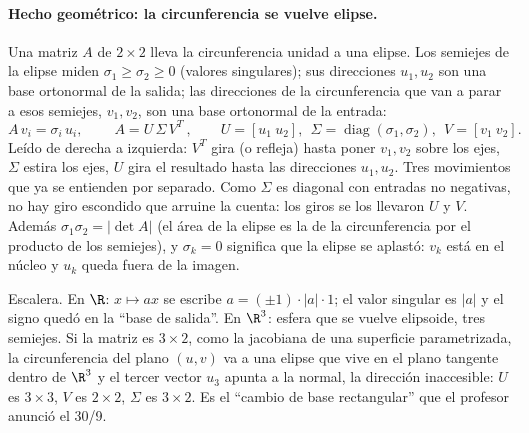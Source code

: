 \paragraph{Hecho geométrico: la circunferencia se vuelve elipse.} Una matriz \(A\) de
\(2\times2\) lleva la circunferencia unidad a una elipse. Los semiejes de la elipse miden
\(\sigma_1\ge\sigma_2\ge0\) (valores singulares); sus direcciones \(u_1,u_2\) son una base
ortonormal de la salida; las direcciones de la circunferencia que van a parar a esos
semiejes, \(v_1,v_2\), son una base ortonormal de la entrada:
\[
  A\,v_i=\sigma_i\,u_i,\qquad
  \boxed{\ A=U\,\Sigma\,V^T\ },\qquad
  U=[u_1\ u_2],\ \ \Sigma=\operatorname{diag}(\sigma_1,\sigma_2),\ \ V=[v_1\ v_2].
\]
Leído de derecha a izquierda: \(V^T\) gira (o refleja) hasta poner \(v_1,v_2\) sobre los
ejes, \(\Sigma\) estira los ejes, \(U\) gira el resultado hasta las direcciones
\(u_1,u_2\). Tres movimientos que ya se entienden por separado. Como \(\Sigma\) es diagonal
con entradas no negativas, no hay giro escondido que arruine la cuenta: los giros se los
llevaron \(U\) y \(V\). Además \(\sigma_1\sigma_2=|\det A|\) (el área de la elipse es la de
la circunferencia por el producto de los semiejes), y \(\sigma_k=0\) significa que la
elipse se aplastó: \(v_k\) está en el núcleo y \(u_k\) queda fuera de la imagen.

Escalera. En \(\R\): \(x\mapsto ax\) se escribe \(a=(\pm1)\cdot|a|\cdot1\); el valor
singular es \(|a|\) y el signo quedó en la ``base de salida''. En \(\R^3\): esfera que se
vuelve elipsoide, tres semiejes. Si la matriz es \(3\times2\), como la jacobiana de una
superficie parametrizada, la circunferencia del plano \((u,v)\) va a una elipse que vive en
el plano tangente dentro de \(\R^3\) y el tercer vector \(u_3\) apunta a la normal, la
dirección inaccesible: \(U\) es \(3\times3\), \(V\) es \(2\times2\), \(\Sigma\) es
\(3\times2\). Es el ``cambio de base rectangular'' que el profesor anunció el 30/9.

